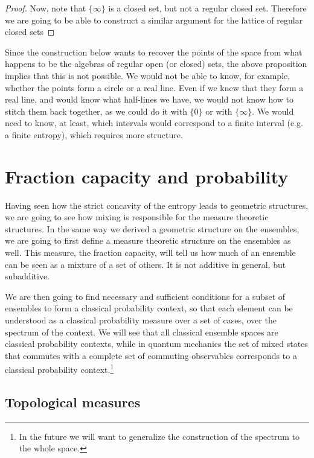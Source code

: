 \begin{proof}
	Now, note that $\{\infty\}$ is a closed set, but not a regular closed set. Therefore we are going to be able to construct a similar argument for the lattice of regular closed sets
\end{proof}

Since the construction below wants to recover the points of the space from what happens to be the algebras of regular open (or closed) sets, the above proposition implies that this is not possible. We would not be able to know, for example, whether the points form a circle or a real line. Even if we knew that they form a real line, and would know what half-lines we have, we would not know how to stitch them back together, as we could do it with $\{0\}$ or with $\{\infty\}$. We would need to know, at least, which intervals would correspond to a finite interval (e.g. a finite entropy), which requires more structure.

\iftrue



\section{Fraction capacity and probability}

Having seen how the strict concavity of the entropy leads to geometric structures, we are going to see how mixing is responsible for the measure theoretic structures. In the same way we derived a geometric structure on the ensembles, we are going to first define a measure theoretic structure on the ensembles as well. This measure, the fraction capacity, will tell us how much of an ensemble can be seen as a mixture of a set of others. It is not additive in general, but subadditive.

We are then going to find necessary and sufficient conditions for a subset of ensembles to form a classical probability context, so that each element can be understood as a classical probability measure over a set of cases, over the spectrum of the context. We will see that all classical ensemble spaces are classical probability contexts, while in quantum mechanics the set of mixed states that commutes with a complete set of commuting observables corresponds to a classical probability context.\footnote{In the future we will want to generalize the construction of the spectrum to the whole space.}

\subsection{Topological measures}


